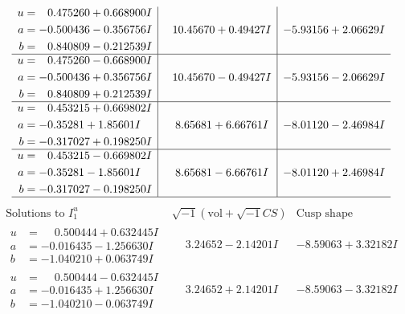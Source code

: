 \documentclass[1p]{elsarticle_modified}
\theoremstyle{definition}
\newcommand{\I}{\sqrt{-1}}
\begin{document}
$$\begin{array}{c|c|c}
\begin{aligned}
u &= \phantom{-}0.475260 + 0.668900 I \\
a &= -0.500436 - 0.356756 I \\
b &= \phantom{-}0.840809 - 0.212539 I\end{aligned}
 & \phantom{-}10.45670 + 0.49427 I & -5.93156 + 2.06629 I \\ \hline\begin{aligned}
u &= \phantom{-}0.475260 - 0.668900 I \\
a &= -0.500436 + 0.356756 I \\
b &= \phantom{-}0.840809 + 0.212539 I\end{aligned}
 & \phantom{-}10.45670 - 0.49427 I & -5.93156 - 2.06629 I \\ \hline\begin{aligned}
u &= \phantom{-}0.453215 + 0.669802 I \\
a &= -0.35281 + 1.85601 I \\
b &= -0.317027 + 0.198250 I\end{aligned}
 & \phantom{-}8.65681 + 6.66761 I & -8.01120 - 2.46984 I \\ \hline\begin{aligned}
u &= \phantom{-}0.453215 - 0.669802 I \\
a &= -0.35281 - 1.85601 I \\
b &= -0.317027 - 0.198250 I\end{aligned}
 & \phantom{-}8.65681 - 6.66761 I & -8.01120 + 2.46984 I\\
 \hline 
 \end{array}$$\newpage$$\begin{array}{c|c|c}  
\text{Solutions to }I^u_{1}& \I (\text{vol} + \sqrt{-1}CS) & \text{Cusp shape}\\
 \hline 
\begin{aligned}
u &= \phantom{-}0.500444 + 0.632445 I \\
a &= -0.016435 - 1.256630 I \\
b &= -1.040210 + 0.063749 I\end{aligned}
 & \phantom{-}3.24652 - 2.14201 I & -8.59063 + 3.32182 I \\ \hline\begin{aligned}
u &= \phantom{-}0.500444 - 0.632445 I \\
a &= -0.016435 + 1.256630 I \\
b &= -1.040210 - 0.063749 I\end{aligned}
 & \phantom{-}3.24652 + 2.14201 I & -8.59063 - 3.32182 I \\ \hline\begin{aligned}

\end{aligned}
\end{array}$$
\end{document}

